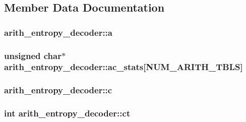 \subsection{Member Data Documentation}
\hypertarget{structarith__entropy__decoder_afb33bbe1e85d3d76b8b119a46db68a77}{}
\subsubsection[{a}]{ arith\+\_\+entropy\+\_\+decoder\+::a}\label{structarith__entropy__decoder_afb33bbe1e85d3d76b8b119a46db68a77}
\hypertarget{structarith__entropy__decoder_ad24b1d5f8dae5839bca9cc749bf9f06e}{}
\subsubsection[{ac\+\_\+stats}]{\setlength{\rightskip}{0pt plus 5cm}unsigned char$\ast$ arith\+\_\+entropy\+\_\+decoder\+::ac\+\_\+stats\mbox{[}{\bf N\+U\+M\+\_\+\+A\+R\+I\+T\+H\+\_\+\+T\+B\+L\+S}\mbox{]}}\label{structarith__entropy__decoder_ad24b1d5f8dae5839bca9cc749bf9f06e}
\hypertarget{structarith__entropy__decoder_abad1e8f477d4015c7069855679885618}{}
\subsubsection[{c}]{ arith\+\_\+entropy\+\_\+decoder\+::c}\label{structarith__entropy__decoder_abad1e8f477d4015c7069855679885618}
\hypertarget{structarith__entropy__decoder_a6c907da02b3db27a4b0f025733a44109}{}
\subsubsection[{ct}]{\setlength{\rightskip}{0pt plus 5cm}int arith\+\_\+entropy\+\_\+decoder\+::ct}\label{structarith__entropy__decoder_a6c907da02b3db27a4b0f025733a44109}
\hypertarget{structarith__entropy__decoder_a0b9a2123aec7d879cff09e315530d5e8}{}
